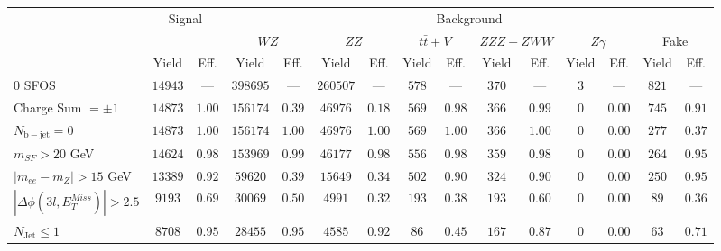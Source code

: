 \begin{tabular}{l||c|c||c|c||c|c||c|c||c|c||c|c||c|c}
\hline
 & \multicolumn{2}{c||}{Signal}       &  \multicolumn{12}{c}{Background}  \\
 & &  & \multicolumn{2}{c||}{$WZ$} & \multicolumn{2}{c||}{$ZZ$} & \multicolumn{2}{c||}{$t\bar{t}+V$} & \multicolumn{2}{c||}{$ZZZ+ZWW$} & \multicolumn{2}{c||}{$Z\gamma$} & \multicolumn{2}{c}{Fake} \\ 
 & Yield & Eff. & Yield & Eff. & Yield & Eff. & Yield & Eff. & Yield & Eff. & Yield & Eff. & Yield & Eff. \\
\hline\hline
0 SFOS &  $14943$ &  --- &  $398695$ &  --- &  $260507$ &  --- &  $578$ &  --- &  $370$ &  --- &  $3$ &  --- &  $821$ &  ---\\ 
\hline
Charge Sum $= \pm 1$ &  $14873$ &  $1.00$ &  $156174$ &  $0.39$ &  $46976$ &  $0.18$ &  $569$ &  $0.98$ &  $366$ &  $0.99$ &  $0$ &  $0.00$ &  $745$ &  $0.91$\\ 
\hline
$N_{\mathrm{b-jet}} = 0$ &  $14873$ &  $1.00$ &  $156174$ &  $1.00$ &  $46976$ &  $1.00$ &  $569$ &  $1.00$ &  $366$ &  $1.00$ &  $0$ &  $0.00$ &  $277$ &  $0.37$\\ 
\hline
$m_{SF} > 20$ GeV &  $14624$ &  $0.98$ &  $153969$ &  $0.99$ &  $46177$ &  $0.98$ &  $556$ &  $0.98$ &  $359$ &  $0.98$ &  $0$ &  $0.00$ &  $264$ &  $0.95$\\ 
\hline
$|m_{ee} - m_{Z}| > 15$ GeV &  $13389$ &  $0.92$ &  $59620$ &  $0.39$ &  $15649$ &  $0.34$ &  $502$ &  $0.90$ &  $324$ &  $0.90$ &  $0$ &  $0.00$ &  $250$ &  $0.95$\\ 
\hline
$|\Delta\phi(3l,E_{T}^{Miss})| > 2.5$ &  $9193$ &  $0.69$ &  $30069$ &  $0.50$ &  $4991$ &  $0.32$ &  $193$ &  $0.38$ &  $193$ &  $0.60$ &  $0$ &  $0.00$ &  $89$ &  $0.36$\\ 
\hline
$N_{\mathrm{Jet}} \leq 1$ &  $8708$ &  $0.95$ &  $28455$ &  $0.95$ &  $4585$ &  $0.92$ &  $86$ &  $0.45$ &  $167$ &  $0.87$ &  $0$ &  $0.00$ &  $63$ &  $0.71$\\ 
\hline
\end{tabular}
